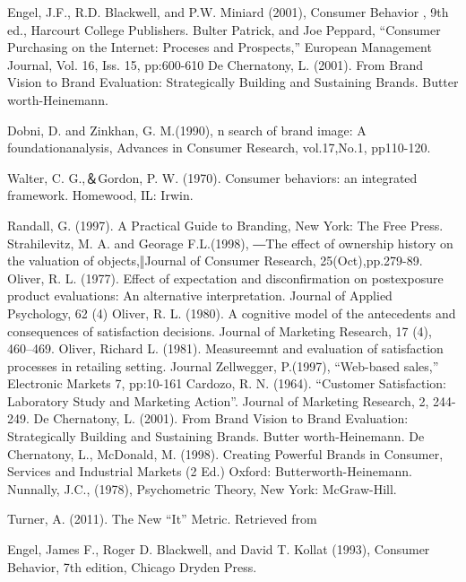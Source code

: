 \documentclass[a4paper,12pt]{report}
\begin{document}
\begin{thebibliography}{1}
Engel, J.F., R.D. Blackwell, and P.W. Miniard (2001), Consumer Behavior , 9th
ed., Harcourt College Publishers.
Bulter Patrick, and Joe Peppard, “Consumer Purchasing on the Internet: Proceses and Prospects,” European Management Journal, Vol. 16, Iss. 15, pp:600-610
De Chernatony, L. (2001). From Brand Vision to Brand Evaluation: Strategically Building and Sustaining Brands. Butter worth-Heinemann.

Dobni, D. and Zinkhan, G. M.(1990), n search of brand image: A foundationanalysis, Advances in Consumer Research, vol.17,No.1, pp110-120.

Walter, C. G.,＆Gordon, P. W. (1970). Consumer behaviors: an integrated framework. Homewood, IL: Irwin.

Randall, G. (1997). A Practical Guide to Branding, New York: The Free Press. Strahilevitz, M. A. and Georage F.L.(1998), ―The effect of ownership history on the valuation of objects,‖Journal of Consumer Research, 25(Oct),pp.279-89.
Oliver, R. L. (1977). Effect of expectation and disconfirmation on postexposure product
evaluations: An alternative interpretation. Journal of Applied Psychology, 62 (4)
Oliver, R. L. (1980). A cognitive model of the antecedents and consequences of satisfaction
decisions. Journal of Marketing Research, 17 (4), 460–469.
Oliver, Richard L. (1981). Measureemnt and evaluation of satisfaction processes in retailing setting. Journal
Zellwegger, P.(1997), “Web-based sales,” Electronic Markets 7, pp:10-161
Cardozo, R. N. (1964). “Customer Satisfaction: Laboratory Study and Marketing Action”. Journal of Marketing Research, 2, 244-249.
De Chernatony, L. (2001). From Brand Vision to Brand Evaluation: Strategically Building and Sustaining Brands. Butter worth-Heinemann.
De Chernatony, L., McDonald, M. (1998). Creating Powerful Brands in Consumer, Services and Industrial Markets (2 Ed.) Oxford: Butterworth-Heinemann.
Nunnally, J.C., (1978), Psychometric Theory, New York: McGraw-Hill. 

Turner, A. (2011). The New “It” Metric. Retrieved from

Engel, James F., Roger D. Blackwell, and David T. Kollat (1993), Consumer
Behavior, 7th edition, Chicago Dryden Press.


\end{thebibliography}
\end{document}
